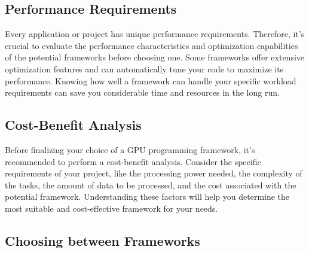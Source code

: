 

\subsection{Performance Requirements}


\par
Every application or project has unique performance requirements.
Therefore, it’s crucial to evaluate the performance characteristics and optimization capabilities of the potential frameworks before choosing one.
Some frameworks offer extensive optimization features and can automatically tune your code to maximize its performance. 
Knowing how well a framework can handle your specific workload requirements can save you considerable time and resources in the long run.




\subsection{Cost-Benefit Analysis}


\par
Before finalizing your choice of a GPU programming framework, it’s recommended to perform a cost-benefit analysis. 
Consider the specific requirements of your project, like the processing power needed, the complexity of the tasks, the amount of data to be processed, and the cost associated with the potential framework.
Understanding these factors will help you determine the most suitable and cost-effective framework for your needs.




\subsection{Choosing between Frameworks}

